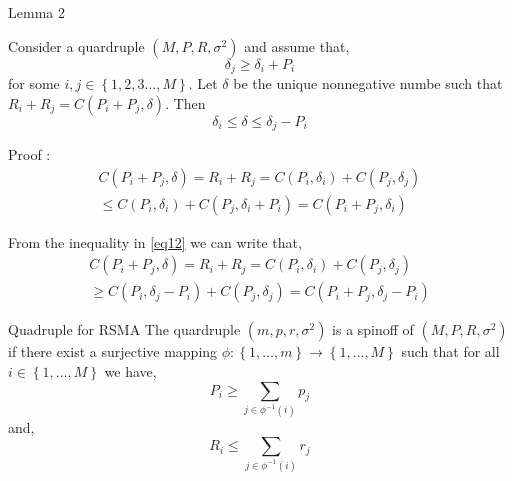 \documentclass[10pt]{beamer}
\begin{document}
\begin{frame}[t]{Lemma 2}	
	\begin{block}{}
		Consider a quardruple   $\left(M, P, R, \sigma^2 \right)$ and assume that,
		\begin{equation}
			\delta_j \geq  \delta_i + P_i \label{eq12}
		\end{equation}
		for some $i,j \in \left\{ 1,2,3 \dots, M\right\}$. Let $\delta$ be the unique nonnegative numbe such that $R_i +R_j = C(P_i + P_j, \delta )$. Then
		\begin{equation}
			\delta_i \leq \delta \leq \delta_j - P_i
		\end{equation}
	\end{block}
Proof : \\
	\begin{align*} 
 C(P_i +P_j , \delta )  = R_i + R_j =   C(P_i, \delta_i ) +  C(P_j , \delta_j )\\ \leq  C(P_i , \delta_i ) +  C(P_j , \delta_i+P_i )  =  C(P_i +P_j , \delta_i )
\end{align*}
\end{frame}
\begin{frame}[t]
From the inequality in \eqref{eq12} we can write that,
\begin{align*}
C(P_i +P_j , \delta )  = R_i + R_j =   C(P_i, \delta_i ) +  C(P_j , \delta_j )\\ \geq  C(P_i , \delta_j-P_i ) +  C(P_j , \delta_j)  =  C(P_i +P_j , \delta_j -P_i )
\end{align*}
\end{frame}
\begin{frame}[t]{Quadruple for RSMA}
The quardruple $\left(m,p,r,\sigma^2\right)$	 is a spinoff of $\left( M, P, R, \sigma^2\right)$ if there exist a surjective mapping 
$\phi : \left\{ 1, \dots, m\right\} \rightarrow \left\{ 1, \dots, M \right\}$ such that for all $i \in \left\{ 1, \dots, M\right\}$ we have,
\begin{equation*}
	P_i \geq \sum_{ j \in \phi^{-1}(i)} p_j
\end{equation*}
and,
\begin{equation*}
	R_i \leq \sum_{ j \in \phi^{-1}(i)} r_j
\end{equation*}
\end{frame}
\end{document}
